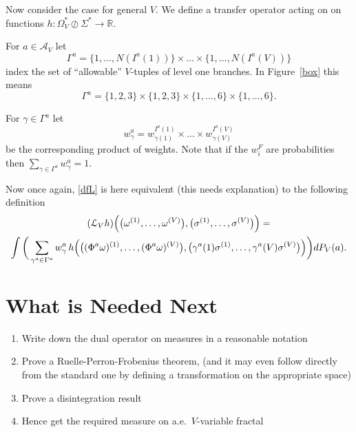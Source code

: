 \documentclass[a4paper]{amsart}
\theoremstyle{plain}
\theoremstyle{definition}
\theoremstyle{remark}
\begin{document}
\bigskip Now consider the  case for general $ V $.  We define a transfer operator acting on on functions
$ h: \Omega_V^*\oslash \Sigma^* \to \mathbb{R} $.



For $ a \in \mathcal{A}_V $ let 
\[
\Gamma^a = \{1,\dots, N(I^a(1))\} \times \dots \times \{1,\dots, N(I^a(V))\}
\]
index the set of ``allowable'' $ V $-tuples   of level one branches.
In Figure~\ref{box} this means  
\[
\Gamma^a = \{1,2,3\}\times \{1,2,3\}\times \{1,\dots, 6\} \times \{1,\dots,6\}.
\]
 
For $ \gamma     \in \Gamma^a $ let 
\[
w_ \gamma ^a = w_{\gamma(1)}^{I^a(1)} \times  \dots \times w_{\gamma(V)}^{I^a(V)}
\]
be the corresponding product of weights.  Note that if   the $ w_i^F $ are probabilities then 
$ \sum_{\gamma \in \Gamma^a} w_ \gamma ^a = 1 $.

Now once again, \eqref{dfL} is here equivalent (this needs explanation) to the following definition 
\begin{gather} \label{}
(\mathcal{L}_Vh) \Big( \big(\omega^{(1)},\dots, \omega^{(V)}\big),  
\big(\sigma^{(1)},\dots, \sigma^{(V)}\big)\Big) =\\
\int \bigg( 
\sum_{\gamma^a \in \Gamma^a} w_ \gamma ^a \,
     h \Big( \big( (\Phi^a\omega)^{(1)},\dots,  (\Phi^a\omega)^{(V)}\big),
                                      \big(\gamma^a (1) \sigma^{(1)},\dots, \gamma^a (V)\sigma^{(V)}\big) \Big)
\bigg) dP_V(a).\notag
\end{gather}

\section{What is Needed Next}
\begin{enumerate}

\item Write down the dual operator on measures in a reasonable notation

\item  Prove a Ruelle-Perron-Frobenius theorem, (and it may even follow directly from the standard one by defining a transformation on the appropriate space)

\item Prove a disintegration result

\item Hence get the required measure on a.e.\  $ V $-variable fractal
\end{enumerate} 
\end{document}
